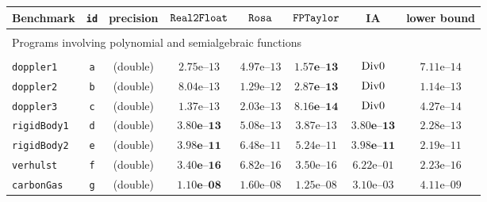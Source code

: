 \begin{tabular}{p{2.3cm}ccccccc}
\hline
\multirow{1}{*}{Benchmark} &  \multirow{1}{*}{\texttt{id}} & \multirow{1}{*}{precision} & \multirow{1}{*}{$\mathtt{Real2Float}$} & $\mathtt{Rosa}$  & $\mathtt{FPTaylor}$  &\multirow{1}{*}{IA} & \multirow{1}{*}{lower bound} \\
\hline  
\\      
\multicolumn{8}{l}{Programs involving polynomial and semialgebraic functions}    \\
\\
\hline
\multirow{1}{*}{\texttt{doppler1}} & \texttt{a}
& (double) & $2.75\text{e--}13$ & $4.97\text{e--}13$ & $\mathbf{1.57\textbf{e--}13}$ & $\text{Div0}$ & $7.11\text{e--}14$\\
\multirow{1}{*}{\texttt{doppler2}} & \texttt{b}
& (double) & $8.04\text{e--}13$ & $1.29\text{e--}12$ & $\mathbf{2.87\textbf{e--}13}$ & $\text{Div0}$ & $1.14\text{e--}13$\\
\multirow{1}{*}{\texttt{doppler3}} & \texttt{c}
& (double) & $1.37\text{e--}13$ & $2.03\text{e--}13$ & $\mathbf{8.16\textbf{e--}14}$ & $\text{Div0}$ & $4.27\text{e--}14$\\
\multirow{1}{*}{\texttt{rigidBody1}} & \texttt{d}
& (double) & $\mathbf{3.80\textbf{e--}13}$ & $5.08\text{e--}13$ & $3.87\text{e--}13$ & $\mathbf{3.80\textbf{e--}13}$ & $2.28\text{e--}13$\\
\multirow{1}{*}{\texttt{rigidBody2}} & \texttt{e}
& (double) & $\mathbf{3.98\textbf{e--}11}$ & $6.48\text{e--}11$ & $5.24\text{e--}11$ & $\mathbf{3.98\textbf{e--}11}$ & $2.19\text{e--}11$\\
\multirow{1}{*}{\texttt{verhulst}} & \texttt{f}
& (double) & $\mathbf{3.40\textbf{e--}16}$ & $6.82\text{e--}16$ & $3.50\text{e--}16$ & $6.22\text{e--}01$ & $2.23\text{e--}16$\\
\multirow{1}{*}{\texttt{carbonGas}} & \texttt{g}
& (double) & $\mathbf{1.10\textbf{e--}08}$ & $1.60\text{e--}08$ & $1.25\text{e--}08$ & $3.10\text{e--}03$ & $4.11\text{e--}09$ \\

\end{tabular}
